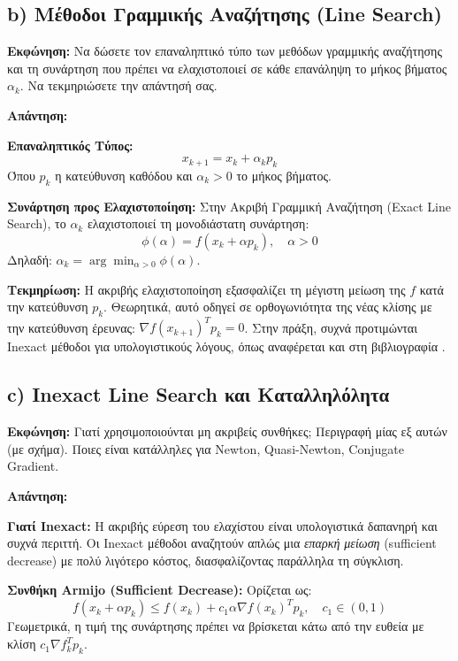 \documentclass[a4paper,12pt]{article}
\begin{document}
\subsection*{b) Μέθοδοι Γραμμικής Αναζήτησης (Line Search)}

\textbf{Εκφώνηση:}
Να δώσετε τον επαναληπτικό τύπο των μεθόδων γραμμικής αναζήτησης και τη συνάρτηση που πρέπει να ελαχιστοποιεί σε κάθε επανάληψη το μήκος βήματος $\alpha_k$. Να τεκμηριώσετε την απάντησή σας.

\textbf{Απάντηση:}

\textbf{Επαναληπτικός Τύπος:}
$$ x_{k+1} = x_k + \alpha_k p_k $$
Όπου $p_k$ η κατεύθυνση καθόδου και $\alpha_k > 0$ το μήκος βήματος.

\textbf{Συνάρτηση προς Ελαχιστοποίηση:}
Στην Ακριβή Γραμμική Αναζήτηση (Exact Line Search), το $\alpha_k$ ελαχιστοποιεί τη μονοδιάστατη συνάρτηση:
$$ \phi(\alpha) = f(x_k + \alpha p_k), \quad \alpha > 0 $$
Δηλαδή: $\alpha_k = \arg \min_{\alpha > 0} \phi(\alpha)$.

\textbf{Τεκμηρίωση:}
Η ακριβής ελαχιστοποίηση εξασφαλίζει τη μέγιστη μείωση της $f$ κατά την κατεύθυνση $p_k$. Θεωρητικά, αυτό οδηγεί σε ορθογωνιότητα της νέας κλίσης με την κατεύθυνση έρευνας: $\nabla f(x_{k+1})^T p_k = 0$. Στην πράξη, συχνά προτιμώνται Inexact μέθοδοι για υπολογιστικούς λόγους, όπως αναφέρεται και στη βιβλιογραφία \cite{nocedal}.

\subsection*{c) Inexact Line Search και Καταλληλόλητα}

\textbf{Εκφώνηση:}
Γιατί χρησιμοποιούνται μη ακριβείς συνθήκες; Περιγραφή μίας εξ αυτών (με σχήμα). Ποιες είναι κατάλληλες για Newton, Quasi-Newton, Conjugate Gradient.

\textbf{Απάντηση:}

\textbf{Γιατί Inexact:}
Η ακριβής εύρεση του ελαχίστου είναι υπολογιστικά δαπανηρή και συχνά περιττή. Οι Inexact μέθοδοι αναζητούν απλώς μια \textit{επαρκή μείωση} (sufficient decrease) με πολύ λιγότερο κόστος, διασφαλίζοντας παράλληλα τη σύγκλιση.

\textbf{Συνθήκη Armijo (Sufficient Decrease):}
Ορίζεται ως:
$$ f(x_k + \alpha p_k) \leq f(x_k) + c_1 \alpha \nabla f(x_k)^T p_k, \quad c_1 \in (0, 1) $$
Γεωμετρικά, η τιμή της συνάρτησης πρέπει να βρίσκεται κάτω από την ευθεία με κλίση $c_1 \nabla f_k^T p_k$.
\end{document}
